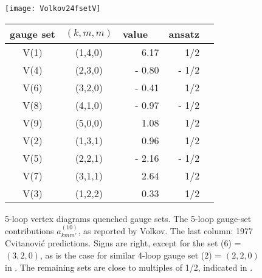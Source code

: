 \begin{figure}[t]
\begin{center}
\texttt{[image: Volkov24fsetV]}
  \\[3ex]
\begin{tabular}{ccrrr}
gauge set &$(k,m,m)$& value~~ & ansatz \\
\hline
  V(1)  & (1,4,0) &   \phantom{+} 6.17  & \phantom{+} 1/2  \\%
  V(4)  & (2,3,0) &  - 0.80  & - 1/2 \\ %
  V(6)  & (3,2,0) &{\color{red}- 0.41} & \phantom{+} 1/2  \\%
  V(8)  & (4,1,0) &  - 0.97  & - 1/2  \\%
  V(9)  & (5,0,0) &  \phantom{+} 1.08  & \phantom{+} 1/2  \\%
  V(2)  & (1,3,1) &  \phantom{+} 0.96  & \phantom{+} 1/2  \\%
  V(5)  & (2,2,1) &  - 2.16  &  - 1/2  \\%
  V(7)  & (3,1,1) &  \phantom{+} 2.64  & \phantom{+} 1/2  \\%
  V(3)  & (1,2,2) &  \phantom{+} 0.33 & \phantom{+} 1/2  \\%
\hline
\end{tabular}
 \end{center}
\caption{\label{Volkov24fsetV}
5-loop vertex diagrams quenched gauge sets.
The 5-loop gauge-set contributions $a^{(10)}_{kmm'}$, as reported by 
Volkov. 
The last column: 1977 Cvitanovi\'c 
predictions. Signs are right, except for the set (6) = 
$(3,2,0)$, as is the case for similar 4-loop gauge set (2) = $(2,2,0)$ in 
. The remaining sets are close to 
multiples of 1/2, indicated in . 
}
 \end{figure}
